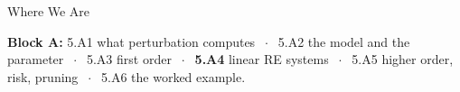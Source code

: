 

\graphicspath{{./figures/}}





\makedecktitle

\begin{frame}{Where We Are}
\vspace{-1mm}
\begin{center}
\small \textbf{Block A:} 5.A1 what perturbation computes $\;\cdot\;$ 5.A2 the model and the parameter $\;\cdot\;$ 5.A3 first order $\;\cdot\;$ \textbf{5.A4} linear RE systems $\;\cdot\;$ 5.A5 higher order, risk, pruning $\;\cdot\;$ 5.A6 the worked example.
\end{center}
\end{frame}

